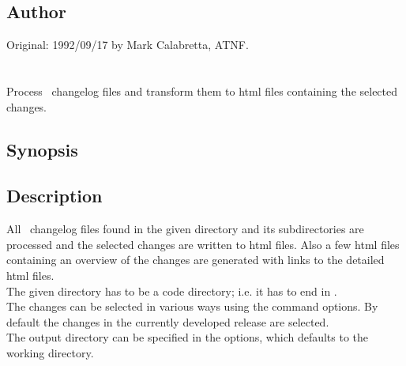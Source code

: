 \subsection*{Author}

Original: 1992/09/17 by Mark Calabretta, ATNF.



\newpage
\section{}
\label{buildchangelog}

Process \aipspp\ changelog files and transform them to
html files containing the selected changes.

\subsection*{Synopsis}

\begin{synopsis}
   \code{\exe{buildchangelog} [\exe{-dir[ectory]} directory]
     [\exe{-split[file]} area|package|module] [\textrm{select-options}
     <directory>}
\end{synopsis}

\subsection*{Description}

All \aipspp\ changelog files found in the given directory and its
subdirectories are processed and the selected changes
are written to html files. 
Also a few html files containing an overview of the changes are
generated with links to the detailed html files.
\\The given directory has to be a code directory; i.e. it has to
end in .
\\The changes can be selected in various ways using the command
options.
By default the changes in the currently developed release are
selected.
\\The output directory can be specified in the options, which defaults
to the working directory.

